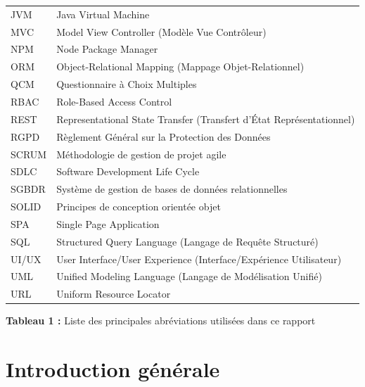 \documentclass[12pt,a4paper]{report}
\begin{document}
\begin{longtable}[]{@{}
  >{\raggedright\arraybackslash}p{}
  >{\raggedright\arraybackslash}p{}@{}}
\rowcolor{lightgray}
JVM & Java Virtual Machine \\
MVC & Model View Controller (Modèle Vue Contrôleur) \\
\rowcolor{lightgray}
NPM & Node Package Manager \\
ORM & Object-Relational Mapping (Mappage Objet-Relationnel) \\
\rowcolor{lightgray}
QCM & Questionnaire à Choix Multiples \\
RBAC & Role-Based Access Control \\
\rowcolor{lightgray}
REST & Representational State Transfer (Transfert d'État Représentationnel) \\
RGPD & Règlement Général sur la Protection des Données \\
\rowcolor{lightgray}
SCRUM & Méthodologie de gestion de projet agile \\
SDLC & Software Development Life Cycle \\
\rowcolor{lightgray}
SGBDR & Système de gestion de bases de données relationnelles \\
SOLID & Principes de conception orientée objet \\
\rowcolor{lightgray}
SPA & Single Page Application \\
SQL & Structured Query Language (Langage de Requête Structuré) \\
\rowcolor{lightgray}
UI/UX & User Interface/User Experience (Interface/Expérience Utilisateur) \\
UML & Unified Modeling Language (Langage de Modélisation Unifié) \\
\rowcolor{lightgray}
URL & Uniform Resource Locator \\
\bottomrule()
\end{longtable}

\begin{center}
\textbf{Tableau 1 :} Liste des principales abréviations utilisées dans ce rapport
\end{center}
\cleardoublepage

\tableofcontents
\cleardoublepage
{}
\listoffigures
\cleardoublepage
{}
\listoftables
\cleardoublepage

\setcounter{page}{1}
\chapter*{Introduction générale}
\end{document}
